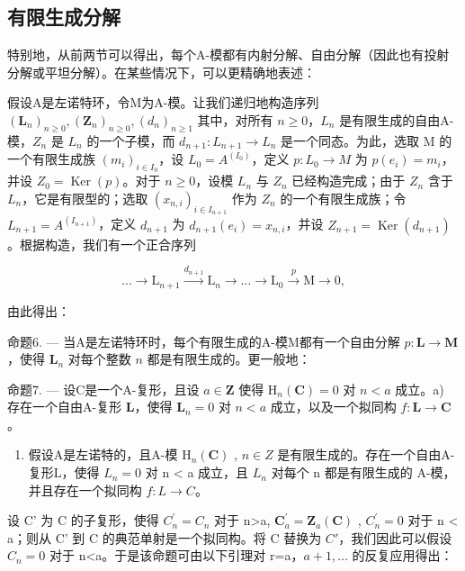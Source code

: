 \subsection{有限生成分解}

特别地，从前两节可以得出，每个A-模都有内射分解、自由分解（因此也有投射分解或平坦分解）。在某些情况下，可以更精确地表述：

假设A是左诺特环，令M为A-模。让我们递归地构造序列 \((\mathbf{L}_{n})_{n\geqslant0},(\mathbf{Z}_{n})_{n\geqslant0},(d_{n})_{n\geqslant1}\) 其中，对所有 \(n\geqslant0\)，\(L_{n}\) 是有限生成的自由A-模，\(Z_{n}\) 是 \(L_{n}\) 的一个子模，而 \(d_{n+1}:L_{n+1}\to L_{n}\) 是一个同态。为此，选取 M 的一个有限生成族 \((m_{i})_{i\in I_{0}}\)，设 \(L_{0}=A^{(I_{0})}\)，定义 \(p:L_{0}\to M\) 为 \(p(e_{i})=m_{i}\)，并设 \(Z_{0}=\operatorname{Ker}(p)\)。对于 \(n\geqslant0\)，设模 \(L_{n}\) 与 \(Z_{n}\) 已经构造完成；由于 \(Z_{n}\) 含于 \(L_{n}\)，它是有限型的；选取 \((x_{n,i})_{i\in I_{n+1}}\) 作为 \(Z_{n}\) 的一个有限生成族；令 \(L_{n+1}=A^{(I_{n+1})}\)，定义 \(d_{n+1}\) 为 \(d_{n+1}(e_{i})=x_{n,i}\)，并设 \(Z_{n+1}=\operatorname{Ker}(d_{n+1})\)。根据构造，我们有一个正合序列

\[
\dots \longrightarrow \mathrm{L} _ {n + 1} \xrightarrow {d _ {n + 1}} \mathrm{L} _ {n} \longrightarrow \dots \longrightarrow \mathrm{L} _ {0} \xrightarrow {p} \mathrm{M} \longrightarrow 0,
\]

由此得出：

命题6. --- 当A是左诺特环时，每个有限生成的A-模M都有一个自由分解 \(p: \mathbf{L} \to \mathbf{M}\)，使得 \(\mathbf{L}_n\) 对每个整数 \(n\) 都是有限生成的。更一般地：

命题7. --- 设C是一个A-复形，且设 \(a \in \mathbf{Z}\) 使得 \(\mathrm{H}_{n}(\mathbf{C}) = 0\) 对 \(n < a\) 成立。a) 存在一个自由A-复形 \(\mathbf{L}\)，使得 \(\mathbf{L}_{n} = 0\) 对 \(n < a\) 成立，以及一个拟同构 \(f: \mathbf{L} \to \mathbf{C}\)。

\begin{enumerate}
\def\labelenumi{\alph{enumi})}
\setcounter{enumi}{1}
\tightlist
\item
  假设A是左诺特的，且A-模 \(\mathrm{H}_{n}(\mathbf{C})\) , \(n \in Z\) 是有限生成的。存在一个自由A-复形L，使得 \(L_{n} = 0\) 对 n \textless{} a 成立，且 \(L_{n}\) 对每个 n 都是有限生成的 A-模，并且存在一个拟同构 \(f: L \to C\)。
\end{enumerate}

设 C' 为 C 的子复形，使得 \(C_{n}^{\prime}=C_{n}\) 对于 n\textgreater a, \(\mathbf{C}_{a}^{\prime}=\mathbf{Z}_{a}(\mathbf{C})\) , \(C_{n}^{\prime}=0\) 对于 n \textless{} a；则从 C' 到 C 的典范单射是一个拟同构。将 C 替换为 \(C'\)，我们因此可以假设 \(C_{n}=0\) 对于 n\textless a。于是该命题可由以下引理对 r=a，\(a+1,\ldots\) 的反复应用得出：

